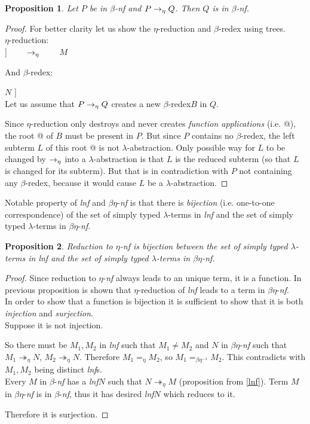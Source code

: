 \documentclass{sig-alternate}
\newtheorem{proposition}{Proposition}
\newcommand{\Lets}{Let us\xspace}
\newcommand{\lets}{let us\xspace}
\newcommand{\lterms}{$\lambda$-terms\xspace}
\newcommand{\lh}[1]{\lambda #1}
\newcommand{\etar}{\twoheadrightarrow_\eta}
\newcommand{\ered}{$\eta$-reduction\xspace}
\newcommand{\bnf}{$\beta$-\textit{nf}\xspace}
\newcommand{\enf}{$\eta$-\textit{nf}\xspace}
\newcommand{\benf}{$\beta\eta$-\textit{nf}\xspace}
\newcommand{\bredex}{$\beta$-redex\xspace}
\newcommand{\lnf}{\textit{lnf}\xspace}
\begin{document}
\begin{proposition}
Let $P$ be in \bnf and $P \rightarrow_\eta Q$. Then $Q$ is in \bnf.    
\end{proposition}
\begin{proof}

For better clarity \lets show the \ered and \bredex using trees.\\
\ered: \\

\Tree [.$\lh{x}$ [.@ $M$ $x$ ] ] 
~~~~$\rightarrow_\eta$~~~~
$M$ 

And \bredex:

\Tree [.@ [.$\lh{x}$ $M$ ] $N$ ] \\

\Lets assume that $P \rightarrow_\eta Q$ creates a new \bredex $B$ in $Q$.

Since \ered only destroys and never creates \textit{function applications} (i.e. @),
the root @ of $B$ must be present in $P$.  
But since $P$ contains no \bredex, the left subterm $L$ of this root @
is not $\lambda$-abstraction.
Only possible way for $L$ to be changed by $\rightarrow_\eta$ into 
a $\lambda$-abstraction is that $L$ is the reduced subterm (so that
$L$ is changed for its subterm).
But that is in contradiction with $P$ not containing any \bredex,
because it would cause $L$ be a $\lambda$-abstraction.
\end{proof}

Notable property of \lnf and \benf is that there is \textit{bijection} 
(i.e. one-to-one correspondence) of 
the set of simply typed \lterms in \lnf and 
the set of simply typed \lterms in \benf.

\begin{proposition}

Reduction to \enf is bijection between  
the set of simply typed \lterms in \lnf and 
the set of simply typed \lterms in \benf.
\end{proposition}
\begin{proof}

Since reduction to \enf always leads to an unique term, it is a function.
In previous proposition is shown that \ered of \lnf
leads to a term in \benf.\\

In order to show that a function is bijection it is sufficient to show that it is
both \textit{injection} and \textit{surjection}.\\

Suppose it is not injection.

So there must be $M_1,M_2$ in \lnf such that $M_1 \not= M_2$
and $N$ in \benf such that $M_1 \etar N$, $M_2 \etar N$.
Therefore $M_1 =_\eta M_2$, 
so $M_1 =_{\beta\eta^{-1}} M_2$.
This contradicts with $M_1,M_2$ being distinct \lnf{}s.\\

Every $M$ in \bnf has a \lnf $N$ such that 
$N \twoheadrightarrow_{\eta} M$ (proposition from \ref{lnf}).
Term $M$ in \benf is in \bnf, thus it has desired \lnf $N$
which reduces to it. 

Therefore it is surjection. 
\end{proof}
\end{document}

